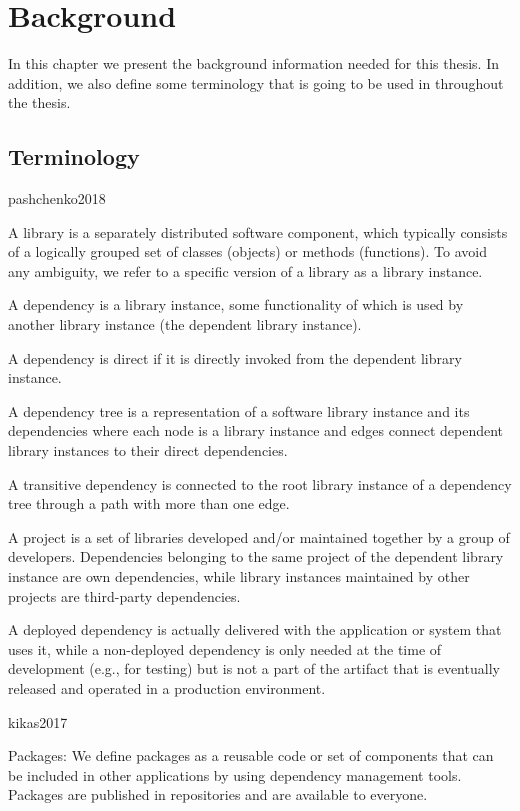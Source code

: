 \chapter{Background}\label{ch:Background}
In this chapter we present the background information needed for this thesis. In addition, we also define some terminology that is going to be used in throughout the thesis.

\section{Terminology}


\blankl
pashchenko2018

A library is a separately distributed software component,
which typically consists of a logically grouped set of classes
(objects) or methods (functions). To avoid any ambiguity, we
refer to a specific version of a library as a library instance.

A dependency is a library instance, some functionality of
which is used by another library instance (the dependent
library instance).

A dependency is direct if it is directly invoked from the
dependent library instance.

A dependency tree is a representation of a software library
instance and its dependencies where each node is a library
instance and edges connect dependent library instances to
their direct dependencies.

A transitive dependency is connected to the root library instance
of a dependency tree through a path with more than
one edge.

A project is a set of libraries developed and/or maintained
together by a group of developers. Dependencies belonging
to the same project of the dependent library instance are own
dependencies, while library instances maintained by other
projects are third-party dependencies.

A deployed dependency is actually delivered with the application
or system that uses it, while a non-deployed dependency
is only needed at the time of development (e.g., for testing)
but is not a part of the artifact that is eventually released
and operated in a production environment.

\blankl
kikas2017

Packages:
We define packages as a reusable code or set of components that can be included in other applications by using dependency management tools. Packages are published in repositories and are available to everyone.

